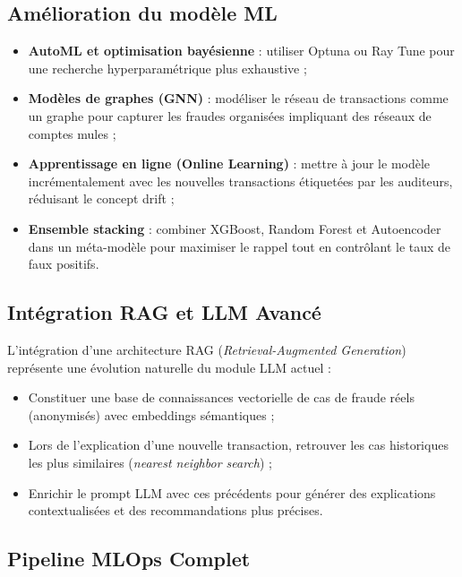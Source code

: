 \documentclass[12pt,a4paper,twoside]{report}
\theoremstyle{definition}
\begin{document}
\subsection{Amélioration du modèle ML}

\begin{itemize}
  \item \textbf{AutoML et optimisation bayésienne} : utiliser Optuna ou Ray Tune
    pour une recherche hyperparamétrique plus exhaustive ;
  \item \textbf{Modèles de graphes (GNN)} : modéliser le réseau de transactions
    comme un graphe pour capturer les fraudes organisées impliquant des
    réseaux de comptes mules ;
  \item \textbf{Apprentissage en ligne (Online Learning)} : mettre à jour le
    modèle incrémentalement avec les nouvelles transactions étiquetées par
    les auditeurs, réduisant le concept drift ;
  \item \textbf{Ensemble stacking} : combiner XGBoost, Random Forest et
    Autoencoder dans un méta-modèle pour maximiser le rappel tout en
    contrôlant le taux de faux positifs.
\end{itemize}

\subsection{Intégration RAG et LLM Avancé}

L'intégration d'une architecture RAG (\textit{Retrieval-Augmented Generation})
représente une évolution naturelle du module LLM actuel :

\begin{itemize}
  \item Constituer une base de connaissances vectorielle de cas de fraude
    réels (anonymisés) avec embeddings sémantiques ;
  \item Lors de l'explication d'une nouvelle transaction, retrouver
    les cas historiques les plus similaires (\textit{nearest neighbor search}) ;
  \item Enrichir le prompt LLM avec ces précédents pour générer des
    explications contextualisées et des recommandations plus précises.
\end{itemize}

\subsection{Pipeline MLOps Complet}
\end{document}
